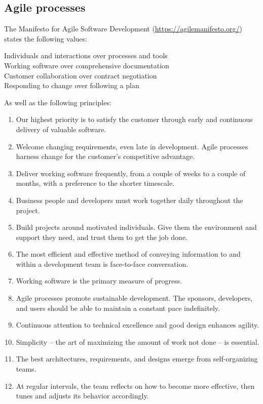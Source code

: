\subsection{Agile processes}
The Manifesto for Agile Software Development (\url{https://agilemanifesto.org/}) states the following values:
\begin{displayquote}
{\Large Individuals and interactions} over processes and tools \\
{\Large Working software} over comprehensive documentation \\
{\Large Customer collaboration} over contract negotiation \\
{\Large Responding to change} over following a plan
\end{displayquote}
As well as the following principles:
\begin{displayquote}
\begin{enumerate}
\item Our highest priority is to satisfy the customer
through early and continuous delivery
of valuable software.
\item Welcome changing requirements, even late in
development. Agile processes harness change for
the customer's competitive advantage.
\item Deliver working software frequently, from a
couple of weeks to a couple of months, with a
preference to the shorter timescale.
\item Business people and developers must work
together daily throughout the project.
\item Build projects around motivated individuals.
Give them the environment and support they need,
and trust them to get the job done.
\item The most efficient and effective method of
conveying information to and within a development
team is face-to-face conversation.
\item Working software is the primary measure of progress.
\item Agile processes promote sustainable development.
The sponsors, developers, and users should be able
to maintain a constant pace indefinitely.
\item Continuous attention to technical excellence
and good design enhances agility.
\item Simplicity -- the art of maximizing the amount
of work not done -- is essential.
\item The best architectures, requirements, and designs
emerge from self-organizing teams.
\item At regular intervals, the team reflects on how
to become more effective, then tunes and adjusts
its behavior accordingly.
\end{enumerate}
\end{displayquote}


